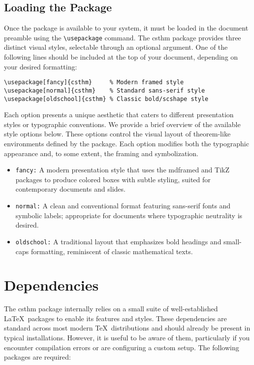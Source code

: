 \documentclass[10pt,letterpaper]{amsart}
\begin{document}
\subsection{Loading the Package}

Once the package is available to your system, it must be loaded in the document
preamble using the \verb|\usepackage| command. The \textsf{csthm} package
provides three distinct visual styles, selectable through an optional argument.
One of the following lines should be included at the top of your document,
depending on your desired formatting:

\begin{verbatim}
\usepackage[fancy]{csthm}     % Modern framed style
\usepackage[normal]{csthm}    % Standard sans-serif style
\usepackage[oldschool]{csthm} % Classic bold/scshape style
\end{verbatim}

Each option presents a unique aesthetic that caters to different presentation
styles or typographic conventions. We provide a brief overview of the available
style options below. These options control the visual layout of theorem-like
environments defined by the package. Each option modifies both the typographic
appearance and, to some extent, the framing and symbolization.

\begin{itemize}[label={--}]
	\item\texttt{fancy:} A modern presentation style that uses the \textsf{mdframed} and \textsf{TikZ} packages to produce colored boxes with subtle styling, suited for contemporary documents and slides.
	\item\texttt{normal:} A clean and conventional format featuring sans-serif fonts and symbolic labels; appropriate for documents where typographic neutrality is desired.
	\item\texttt{oldschool:} A traditional layout that emphasizes bold headings and small-caps formatting, reminiscent of classic mathematical texts.
\end{itemize}

\section{Dependencies}

The \textsf{csthm} package internally relies on a small suite of
well-established \LaTeX\ packages to enable its features and styles. These
dependencies are standard across most modern \TeX\ distributions and should
already be present in typical installations. However, it is useful to be aware
of them, particularly if you encounter compilation errors or are configuring a
custom setup. The following packages are required:
\end{document}
